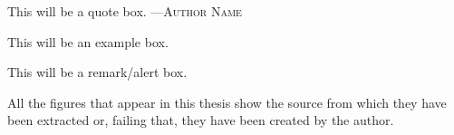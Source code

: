 \begin{quoteBox}
  This will be a quote box.
  \tcblower
  ---\textsc{Author Name}
\end{quoteBox}

\begin{exampleBox}
  This will be an example box.
\end{exampleBox}

\begin{remarkBox}
  This will be a remark/alert box.
\end{remarkBox}

All the figures that appear in this thesis show the source from which they have
been extracted or, failing that, they have been created by the author.
